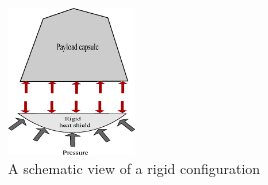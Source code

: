 \begin{figure}[H]
\centering
\includegraphics[width = 0.3\textwidth]{Figure/FBD_rigid.eps}
\caption{A schematic view of a rigid configuration}
\label{fig:fbd_rigid}
\end{figure}

\
